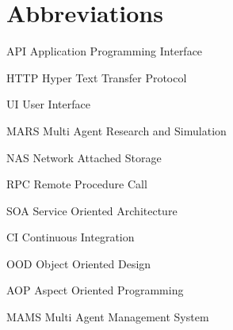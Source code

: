     \newcommand{\abbrlabel}[1]{\makebox[3cm][l]{\textbf{#1}\ }}
\newenvironment{abbreviations}{\begin{list}{}{\renewcommand{\makelabel}{\abbrlabel}}}{\end{list}}
%

\newpage
\section*{Abbreviations}
\begin{abbreviations}
\item[API] Application Programming Interface
\item[HTTP] Hyper Text Transfer Protocol
\item[UI] User Interface
\item[MARS] Multi Agent Research and Simulation
\item[NAS] Network Attached Storage
\item[RPC] Remote Procedure Call
\item[SOA] Service Oriented Architecture
\item[CI] Continuous Integration
\item[OOD] Object Oriented Design
\item[AOP] Aspect Oriented Programming
\item[MAMS] Multi Agent Management System
\end{abbreviations}
%